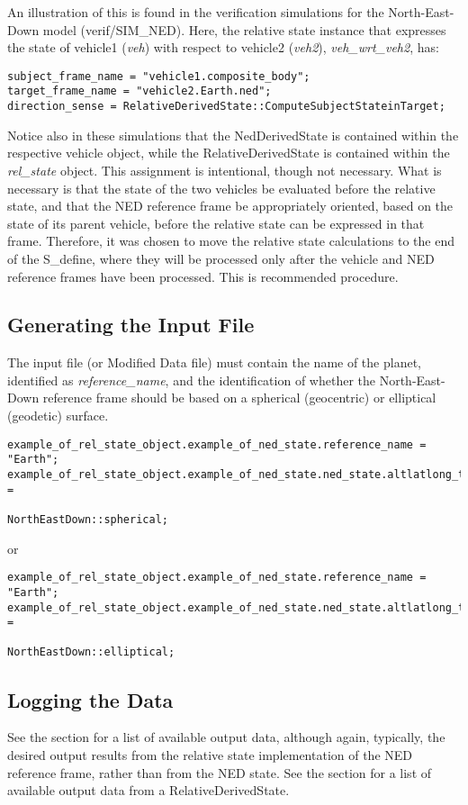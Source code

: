 An illustration of this is found in the verification simulations for the North-East-Down model (verif/SIM\_NED).  Here, the relative state instance that expresses the state of vehicle1 (\textit{veh}) with respect to vehicle2 (\textit{veh2}), \textit{veh\_wrt\_veh2}, has:
\begin{verbatim}
subject_frame_name = "vehicle1.composite_body";
target_frame_name = "vehicle2.Earth.ned";
direction_sense = RelativeDerivedState::ComputeSubjectStateinTarget;
\end{verbatim}

Notice also in these simulations that the NedDerivedState is contained within the respective vehicle object, while the RelativeDerivedState is contained within the \textit{rel\_state} object.  This assignment is intentional, though not necessary.  What is necessary is that the state of the two vehicles be evaluated before the relative state, and that the NED reference frame be appropriately oriented, based on the state of its parent vehicle, before the relative state can be expressed in that frame.  Therefore, it was chosen to move the relative state calculations to the end of the S\_define, where they will be processed only after the vehicle and NED reference frames have been processed.  This is recommended procedure.

\subsection{Generating the Input File}
The input file (or Modified Data file) must contain the name of the planet, identified as \textit{reference\_name}, and the identification of whether the North-East-Down reference frame should be based on a spherical (geocentric) or elliptical (geodetic) surface.
\begin{verbatim}
example_of_rel_state_object.example_of_ned_state.reference_name = "Earth";
example_of_rel_state_object.example_of_ned_state.ned_state.altlatlong_type = 
                                                       NorthEastDown::spherical;
\end{verbatim}
or
\begin{verbatim}
example_of_rel_state_object.example_of_ned_state.reference_name = "Earth";
example_of_rel_state_object.example_of_ned_state.ned_state.altlatlong_type = 
                                                     NorthEastDown::elliptical;
\end{verbatim}

\subsection{Logging the Data}
See the  section for a list of available output data, although again, typically, the desired output results from the relative state implementation of the NED reference frame, rather than from the NED state.  See the  section for a list of available output data from a RelativeDerivedState.